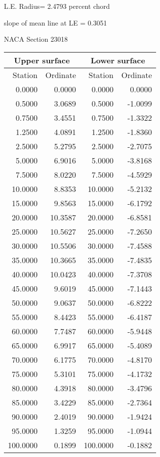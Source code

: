 \documentclass[11pt]{book}
\begin{document}
L.E. Radius=  2.4793 percent chord


 slope of mean line at LE =  0.3051
 \newpage
  \label{s23018}
 \begin{Large}
 NACA Section 23018
 \end{Large}
  
 \vspace{8mm}
 \begin{tabular}{|r|r|r|r|} \hline 
 \multicolumn{2}{|c|}{Upper surface} & \multicolumn{2}{|c|}{Lower surface} \\
 \hline
 Station & Ordinate & Station & Ordinate \\
 \hline
0.0000 & 0.0000 & 0.0000 & 0.0000 \\
0.5000 & 3.0689 & 0.5000 & -1.0099 \\
0.7500 & 3.4551 & 0.7500 & -1.3322 \\
1.2500 & 4.0891 & 1.2500 & -1.8360 \\
2.5000 & 5.2795 & 2.5000 & -2.7075 \\
5.0000 & 6.9016 & 5.0000 & -3.8168 \\
7.5000 & 8.0220 & 7.5000 & -4.5929 \\
10.0000 & 8.8353 & 10.0000 & -5.2132 \\
15.0000 & 9.8563 & 15.0000 & -6.1792 \\
20.0000 & 10.3587 & 20.0000 & -6.8581 \\
25.0000 & 10.5627 & 25.0000 & -7.2650 \\
30.0000 & 10.5506 & 30.0000 & -7.4588 \\
35.0000 & 10.3665 & 35.0000 & -7.4835 \\
40.0000 & 10.0423 & 40.0000 & -7.3708 \\
45.0000 & 9.6019 & 45.0000 & -7.1443 \\
50.0000 & 9.0637 & 50.0000 & -6.8222 \\
55.0000 & 8.4423 & 55.0000 & -6.4187 \\
60.0000 & 7.7487 & 60.0000 & -5.9448 \\
65.0000 & 6.9917 & 65.0000 & -5.4089 \\
70.0000 & 6.1775 & 70.0000 & -4.8170 \\
75.0000 & 5.3101 & 75.0000 & -4.1732 \\
80.0000 & 4.3918 & 80.0000 & -3.4796 \\
85.0000 & 3.4229 & 85.0000 & -2.7364 \\
90.0000 & 2.4019 & 90.0000 & -1.9424 \\
95.0000 & 1.3259 & 95.0000 & -1.0944 \\
100.0000 & 0.1899 & 100.0000 & -0.1882 \\
 \hline 
 \end{tabular}
\end{document}
